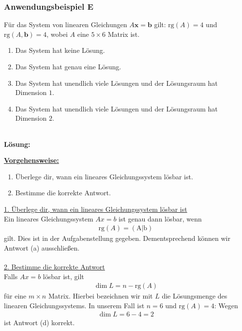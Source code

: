\subsubsection*{Anwendungsbeispiel E}
Für das System von linearen Gleichungen $A \textbf{x} = \textbf{b}$ gilt:
$\text{rg}(A) = 4$ und $\text{rg}(A,\textbf{b}) = 4$, wobei $A$ eine $5 \times 6$ Matrix ist.
\renewcommand{\labelenumi}{(\alph{enumi})}
\begin{enumerate}
\item 
Das System hat keine Lösung.
\item
Das System hat genau eine Lösung.
\item
Das System hat unendlich viele Lösungen und der Lösungsraum hat Dimension $1$.
\item
Das System hat unendlich viele Lösungen und der Lösungsraum hat Dimension $2$.
\end{enumerate}
\ \\
\textbf{Lösung:}
\begin{mdframed}
\underline{\textbf{Vorgehensweise:}}
\renewcommand{\labelenumi}{\theenumi.}
\begin{enumerate}
\item Überlege dir, wann ein lineares Gleichungssystem lösbar ist.
\item Bestimme die korrekte Antwort.
\end{enumerate}
\end{mdframed}

\underline{1. Überlege dir, wann ein lineares Gleichungssystem lösbar ist}\\
Ein lineares Gleichungssystem $ A x  = b$ ist genau dann lösbar, wenn
\begin{align*}
\mathrm{rg}(A) = \mathrm{(A| b) }
\end{align*}
gilt.
Dies ist in der Aufgabenstellung gegeben.
Dementsprechend können wir Antwort (a) ausschließen.\\
\\

\underline{2. Bestimme die korrekte Antwort}\\
Falls $Ax = b$ lösbar ist, gilt
\begin{align*}
\dim L = n - \mathrm{rg}(A)
\end{align*}
für eine $m \times n $ Matrix.
Hierbei bezeichnen wir mit $L$ die Lösungsmenge des linearen Gleichungssystems.
In unserem Fall ist $n = 6$ und $\mathrm{rg}(A)  =4$:
Wegen
\begin{align*}
\dim L = 6 - 4 = 2
\end{align*}
ist Antwort (d) korrekt.

